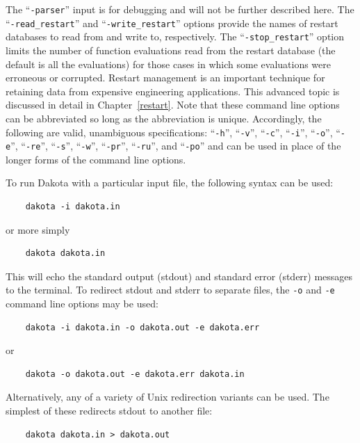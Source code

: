 The ``\texttt{-parser}'' input is for debugging and will not
be further described here. The ``\texttt{-read\_restart}''
and ``\texttt{-write\_restart}'' options provide the names of
restart databases to read from and write to, respectively. The
``\texttt{-stop\_restart}'' option limits the number of
function evaluations read from the restart database (the default is all
the evaluations) for those cases in which some evaluations were erroneous
or corrupted. Restart management is an important technique for retaining
data from expensive engineering applications. This advanced topic is
discussed in detail in Chapter~\ref{restart}. Note that these command
line options can be abbreviated so long as the abbreviation is unique.
Accordingly, the following are valid, unambiguous specifications: ``\texttt{-h}'',
``\texttt{-v}'', ``\texttt{-c}'', ``\texttt{-i}'', ``\texttt{-o}'',
``\texttt{-e}'', ``\texttt{-re}'', ``\texttt{-s}'', ``\texttt{-w}'',
``\texttt{-pr}'', ``\texttt{-ru}'', and ``\texttt{-po}'' and can be used
in place of the longer forms of the command line options.

To run Dakota with a particular input file, the following syntax can
be used:
\begin{small}
\begin{verbatim}
    dakota -i dakota.in
\end{verbatim}
\end{small}
or more simply
\begin{small}
\begin{verbatim}
    dakota dakota.in
\end{verbatim}
\end{small}

This will echo the standard output (stdout) and standard error
(stderr) messages to the terminal. To redirect stdout and stderr to
separate files, the \texttt{-o} and \texttt{-e} command line options
may be used:
\begin{small}
\begin{verbatim}
    dakota -i dakota.in -o dakota.out -e dakota.err
\end{verbatim}
\end{small}
or
\begin{small}
\begin{verbatim}
    dakota -o dakota.out -e dakota.err dakota.in
\end{verbatim}
\end{small}

Alternatively, any of a variety of Unix redirection variants can be
used. The simplest of these redirects stdout to another file:
\begin{small}
\begin{verbatim}
    dakota dakota.in > dakota.out
\end{verbatim}
\end{small}

